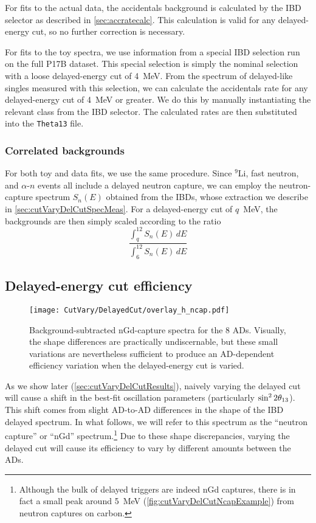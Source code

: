 \documentclass[../thesis.tex]{subfiles}
\begin{document}
For fits to the actual data, the accidentals background is calculated by the IBD selector as described in \autoref{sec:accratecalc}. This calculation is valid for any delayed-energy cut, so no further correction is necessary.

For fits to the toy spectra, we use information from a special IBD selection run on the full P17B dataset. This special selection is simply the nominal selection with a loose delayed-energy cut of 4~MeV. From the spectrum of delayed-like singles measured with this selection, we can calculate the accidentals rate for any delayed-energy cut of 4~MeV or greater. We do this by manually instantiating the relevant class from the IBD selector. The calculated rates are then substituted into the \texttt{Theta13} file.

\subsubsection{Correlated backgrounds}

For both toy and data fits, we use the same procedure. Since $^9$Li, fast neutron, and $\alpha$-$n$ events all include a delayed neutron capture, we can employ the neutron-capture spectrum $S_n(E)$ obtained from the IBDs, whose extraction we describe in \autoref{sec:cutVaryDelCutSpecMeas}. For a delayed-energy cut of $q$~MeV, the backgrounds are then simply scaled according to the ratio
\begin{equation}
  \label{eq:cutVaryDelCutCorrBkgScale}
  \frac{\int_q^{12} S_n(E)\,dE}{\int_6^{12} S_n(E)\,dE}
\end{equation}

\subsection{Delayed-energy cut efficiency}
\label{sec:cutVaryDelCutEff}

\begin{figure}[ht]
  \texttt{[image: CutVary/DelayedCut/overlay\_h\_ncap.pdf]}
  \caption{Background-subtracted nGd-capture spectra for the 8 ADs. Visually, the shape differences are practically undiscernable, but these small variations are nevertheless sufficient to produce an AD-dependent efficiency variation when the delayed-energy cut is varied.}
  \label{fig:cutVaryDelCutSpecOverlay}
\end{figure}

As we show later (\autoref{sec:cutVaryDelCutResults}), naively varying the delayed cut will cause a shift in the best-fit oscillation parameters (particularly $\sin^2 2\theta_{13}$). This shift comes from slight AD-to-AD differences in the shape of the IBD delayed spectrum. In what follows, we will refer to this spectrum as the ``neutron capture'' or ``nGd'' spectrum.\footnote{Although the bulk of delayed triggers are indeed nGd captures, there is in fact a small peak around 5~MeV (\autoref{fig:cutVaryDelCutNcapExample}) from neutron captures on carbon.} Due to these shape discrepancies, varying the delayed cut will cause its efficiency to vary by different amounts between the ADs.
\end{document}

